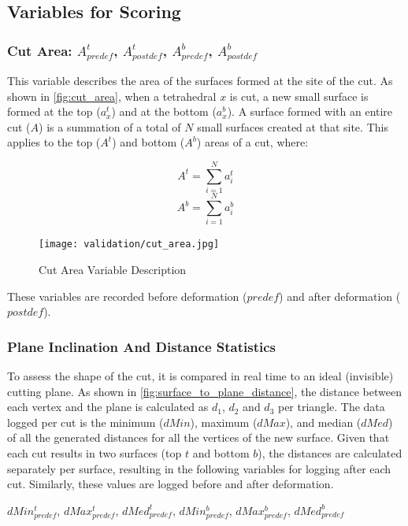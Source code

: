 \subsection{Variables for Scoring}

\subsubsection{Cut Area: $A^t_{predef}$, $A^t_{postdef}$, $A^b_{predef}$, $A^b_{postdef}$}
\label{para:data_cut_area}

This variable describes the area of the surfaces formed at the site of the cut. As shown in \autoref{fig:cut_area}, when a tetrahedral $x$ is cut, a new small surface is formed at the top ($a^t_x$) and at the bottom ($a^b_x$). A surface formed with an entire cut ($A$) is a summation of a total of $N$ small surfaces created at that site. This applies to the top ($A^t$) and bottom ($A^b$) areas of a cut, where:

\[ A^t = \sum_{i=1}^{N}a^t_i \]
\[ A^b = \sum_{i=1}^{N}a^b_i \]

\begin{figure}
  \centering%
  \texttt{[image: validation/cut\_area.jpg]}
  \caption{Cut Area Variable Description}
  \label{fig:cut_area}
\end{figure}

These variables are recorded before deformation ($predef$) and after deformation ($postdef$).

\subsubsection{Plane Inclination And Distance Statistics}
\label{para:data_plane_inclination_and_distance}

To assess the shape of the cut, it is compared in real time to an ideal (invisible) cutting plane. As shown in \autoref{fig:surface_to_plane_distance}, the distance between each vertex and the plane is calculated as $d_1$, $d_2$ and $d_3$ per triangle. The data logged per cut is the minimum ($dMin$), maximum ($dMax$), and median ($dMed$) of all the generated distances for all the vertices of the new surface. Given that each cut results in two surfaces (top $t$ and bottom $b$), the distances are calculated separately per surface, resulting in the following variables for logging after each cut. Similarly, these values are logged before and after deformation.

\hfill

$dMin_{predef}^t$, $dMax_{predef}^t$, $dMed_{predef}^t$, $dMin_{predef}^b$, $dMax_{predef}^b$, $dMed_{predef}^b$


